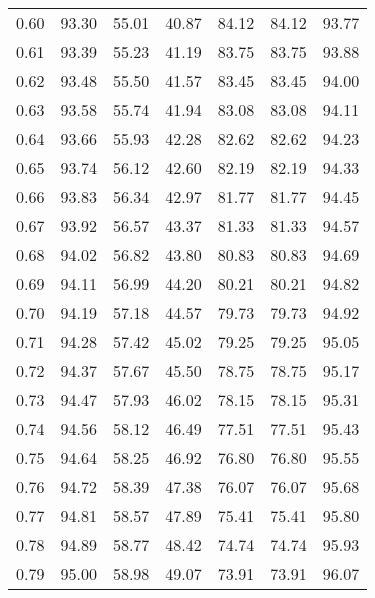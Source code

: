 \begin{tabular}{|c|c|c|c|c|c|c|}
      0.60 &     93.30 &     55.01 &      40.87 &   84.12 &      84.12 &         93.77 \\
      0.61 &     93.39 &     55.23 &      41.19 &   83.75 &      83.75 &         93.88 \\
      0.62 &     93.48 &     55.50 &      41.57 &   83.45 &      83.45 &         94.00 \\
      0.63 &     93.58 &     55.74 &      41.94 &   83.08 &      83.08 &         94.11 \\
      0.64 &     93.66 &     55.93 &      42.28 &   82.62 &      82.62 &         94.23 \\
      0.65 &     93.74 &     56.12 &      42.60 &   82.19 &      82.19 &         94.33 \\
      0.66 &     93.83 &     56.34 &      42.97 &   81.77 &      81.77 &         94.45 \\
      0.67 &     93.92 &     56.57 &      43.37 &   81.33 &      81.33 &         94.57 \\
      0.68 &     94.02 &     56.82 &      43.80 &   80.83 &      80.83 &         94.69 \\
      0.69 &     94.11 &     56.99 &      44.20 &   80.21 &      80.21 &         94.82 \\
      0.70 &     94.19 &     57.18 &      44.57 &   79.73 &      79.73 &         94.92 \\
      0.71 &     94.28 &     57.42 &      45.02 &   79.25 &      79.25 &         95.05 \\
      0.72 &     94.37 &     57.67 &      45.50 &   78.75 &      78.75 &         95.17 \\
      0.73 &     94.47 &     57.93 &      46.02 &   78.15 &      78.15 &         95.31 \\
      0.74 &     94.56 &     58.12 &      46.49 &   77.51 &      77.51 &         95.43 \\
      0.75 &     94.64 &     58.25 &      46.92 &   76.80 &      76.80 &         95.55 \\
      0.76 &     94.72 &     58.39 &      47.38 &   76.07 &      76.07 &         95.68 \\
      0.77 &     94.81 &     58.57 &      47.89 &   75.41 &      75.41 &         95.80 \\
      0.78 &     94.89 &     58.77 &      48.42 &   74.74 &      74.74 &         95.93 \\
      0.79 &     95.00 &     58.98 &      49.07 &   73.91 &      73.91 &         96.07 \\

\end{tabular}
